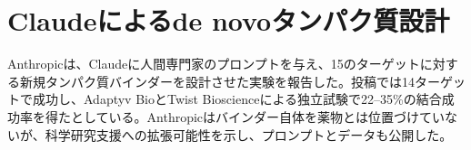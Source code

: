 \section{Claudeによるde novoタンパク質設計}
Anthropicは、Claudeに人間専門家のプロンプトを与え、15のターゲットに対する新規タンパク質バインダーを設計させた実験を報告した。投稿では14ターゲットで成功し、Adaptyv BioとTwist Bioscienceによる独立試験で22--35\%の結合成功率を得たとしている。Anthropicはバインダー自体を薬物とは位置づけていないが、科学研究支援への拡張可能性を示し、プロンプトとデータも公開した。
